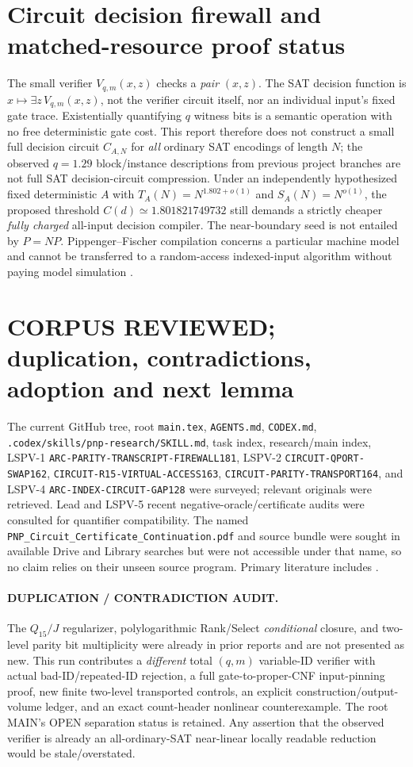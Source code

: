 \documentclass[11pt]{article}
\begin{document}
\section{Circuit decision firewall and matched-resource proof status}
The small verifier $V_{q,m}(x,z)$ checks a \emph{pair} $(x,z)$. The SAT decision function is $x\mapsto\exists z\,V_{q,m}(x,z)$, not the verifier circuit itself, nor an individual input's fixed gate trace. Existentially quantifying $q$ witness bits is a semantic operation with no free deterministic gate cost. This report therefore does not construct a small full decision circuit $C_{A,N}$ for \emph{all} ordinary SAT encodings of length $N$; the observed $q=1.29$ block/instance descriptions from previous project branches are not full SAT decision-circuit compression. Under an independently hypothesized fixed deterministic $A$ with $T_A(N)=N^{1.802+o(1)}$ and $S_A(N)=N^{o(1)}$, the proposed threshold $C(d)\simeq1.801821749732$ still demands a strictly cheaper \emph{fully charged} all-input decision compiler. The near-boundary seed is not entailed by $P=NP$. Pippenger--Fischer compilation concerns a particular machine model and cannot be transferred to a random-access indexed-input algorithm without paying model simulation \cite{pf1979,flmv2005}.

\section{CORPUS REVIEWED; duplication, contradictions, adoption and next lemma}
The current GitHub tree, root \texttt{main.tex}, \texttt{AGENTS.md}, \texttt{CODEX.md}, \texttt{.codex/skills/pnp-research/SKILL.md}, task index, research/main index, LSPV-1 \texttt{ARC-PARITY-TRANSCRIPT-FIREWALL181}, LSPV-2 \texttt{CIRCUIT-QPORT-SWAP162}, \texttt{CIRCUIT-R15-VIRTUAL-ACCESS163}, \texttt{CIRCUIT-PARITY-TRANSPORT164}, and LSPV-4 \texttt{ARC-INDEX-CIRCUIT-GAP128} were surveyed; relevant originals were retrieved. Lead and LSPV-5 recent negative-oracle/certificate audits were consulted for quantifier compatibility. The named \texttt{PNP\_Circuit\_Certificate\_Continuation.pdf} and source bundle were sought in available Drive and Library searches but were not accessible under that name, so no claim relies on their unseen source program. Primary literature includes \cite{batcher,pf1979,flmv2005,vm2007,doecker2019}.

\paragraph{DUPLICATION / CONTRADICTION AUDIT.} The $Q_{15}/J$ regularizer, polylogarithmic Rank/Select \emph{conditional} closure, and two-level parity bit multiplicity were already in prior reports and are not presented as new. This run contributes a \emph{different} total $(q,m)$ variable-ID verifier with actual bad-ID/repeated-ID rejection, a full gate-to-proper-CNF input-pinning proof, new finite two-level transported controls, an explicit construction/output-volume ledger, and an exact count-header nonlinear counterexample. The root MAIN's OPEN separation status is retained. Any assertion that the observed verifier is already an all-ordinary-SAT near-linear locally readable reduction would be stale/overstated.
\end{document}
